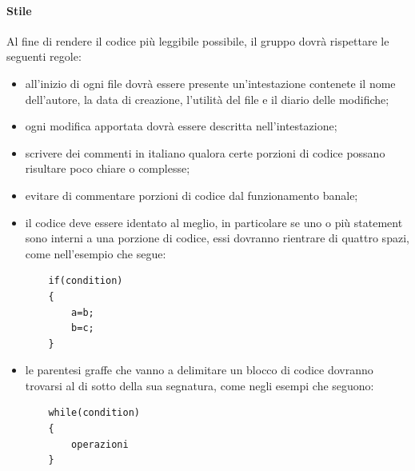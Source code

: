  \paragraph{Stile}
 Al fine di rendere il codice più leggibile possibile, il gruppo dovrà rispettare le seguenti regole:
 \begin{itemize}
 	\item all'inizio di ogni file dovrà essere presente un'intestazione contenete il nome dell'autore, la data di creazione, l'utilità del file e il diario delle modifiche;
 	\item ogni modifica apportata dovrà essere descritta nell'intestazione;
 	\item scrivere dei commenti in italiano qualora certe porzioni di codice possano risultare poco chiare o complesse;
 	\item evitare di commentare porzioni di codice dal funzionamento banale;
 	\item il codice deve essere identato al meglio, in particolare se uno o più statement sono interni a una porzione di codice, essi dovranno rientrare di quattro spazi, come nell'esempio che segue: \begin{verbatim}
 	if(condition)
 	{
 	    a=b;
 	    b=c;
 	}
 	\end{verbatim}
 	\item le parentesi graffe che vanno a delimitare un blocco di codice dovranno trovarsi al di sotto della sua segnatura, come negli esempi che seguono:
 	\begin{verbatim}
 	while(condition)
 	{
 	    operazioni
 	}
 	

\end{verbatim}
\end{itemize}

